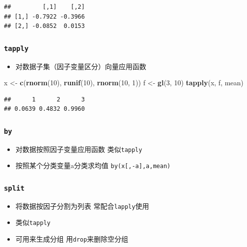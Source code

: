 \documentclass[
]{book}
\newenvironment{Shaded}{\begin{snugshade}}{\end{snugshade}}
\newcommand{\DecValTok}[1]{\textcolor[rgb]{0.00,0.00,0.81}{#1}}
\newcommand{\KeywordTok}[1]{\textcolor[rgb]{0.13,0.29,0.53}{\textbf{#1}}}
\newcommand{\NormalTok}[1]{#1}
\newcommand{\StringTok}[1]{\textcolor[rgb]{0.31,0.60,0.02}{#1}}
\providecommand{\tightlist}{%
  \setlength{\itemsep}{0pt}\setlength{\parskip}{0pt}}
\begin{document}
\begin{verbatim}
##         [,1]    [,2]
## [1,] -0.7922 -0.3966
## [2,] -0.0852  0.0153
\end{verbatim}

\hypertarget{tapply}{%
\subsubsection{\texorpdfstring{\texttt{tapply}}{tapply}}\label{tapply}}

\begin{itemize}
\tightlist
\item
  对数据子集（因子变量区分）向量应用函数
\end{itemize}

\begin{Shaded}
\begin{Highlighting}[]
\NormalTok{x <-}\StringTok{ }\KeywordTok{c}\NormalTok{(}\KeywordTok{rnorm}\NormalTok{(}\DecValTok{10}\NormalTok{), }\KeywordTok{runif}\NormalTok{(}\DecValTok{10}\NormalTok{), }\KeywordTok{rnorm}\NormalTok{(}\DecValTok{10}\NormalTok{, }\DecValTok{1}\NormalTok{))}
\NormalTok{f <-}\StringTok{ }\KeywordTok{gl}\NormalTok{(}\DecValTok{3}\NormalTok{, }\DecValTok{10}\NormalTok{)}
\KeywordTok{tapply}\NormalTok{(x, f, mean)}
\end{Highlighting}
\end{Shaded}

\begin{verbatim}
##      1      2      3 
## 0.0639 0.4832 0.9960
\end{verbatim}

\hypertarget{by}{%
\subsubsection{\texorpdfstring{\texttt{by}}{by}}\label{by}}

\begin{itemize}
\tightlist
\item
  对数据按照因子变量应用函数 类似\texttt{tapply}
\item
  按照某个分类变量a分类求均值 \texttt{by(x{[},-a{]},a,mean)}
\end{itemize}

\hypertarget{split}{%
\subsubsection{\texorpdfstring{\texttt{split}}{split}}\label{split}}

\begin{itemize}
\tightlist
\item
  将数据按因子分割为列表 常配合\texttt{lapply}使用
\item
  类似\texttt{tapply}
\item
  可用来生成分组 用\texttt{drop}来删除空分组
\end{itemize}
\end{document}
